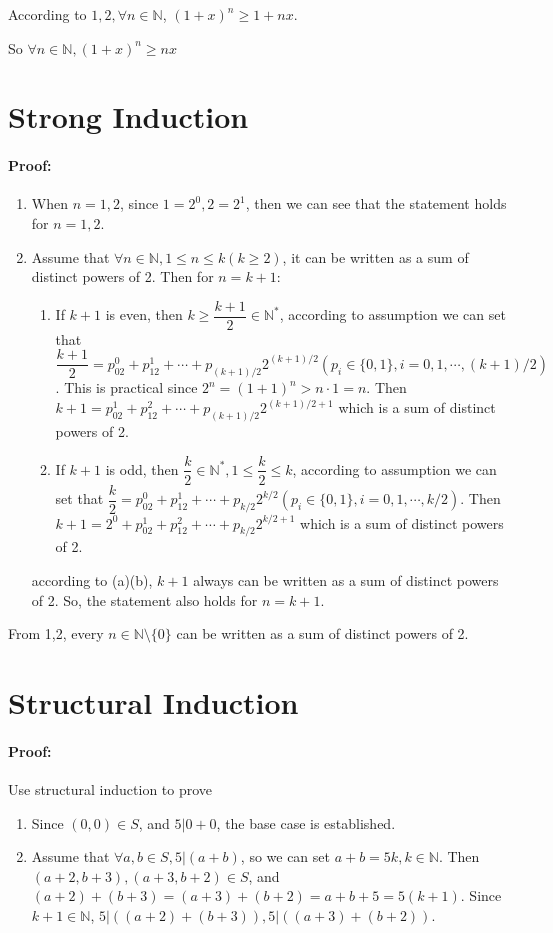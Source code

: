 \documentclass[a4paper,12pt,titlepage]{article}
\begin{document}
According to $1,2, \forall n \in\mathbb{N}$, $(1+x)^n\geqslant1+nx$.

So $ \forall n \in \mathbb{N}, (1+x)^n \geqslant nx$

\section{Strong Induction}
\paragraph{Proof:}
\begin{enumerate}
\item When $n=1,2$, since $1=2^0,2=2^1$, then we can see that the statement holds for $n=1,2$.
\item Assume that $\forall n\in\mathbb{N},1\leqslant n\leqslant k(k\geqslant2)$, it can be written as a sum of distinct powers of 2. Then for $n=k+1$:
\begin{enumerate}
\item If $k+1$ is even, then $k\geqslant\dfrac{k+1}{2}\in\mathbb{N}^*$, according to assumption we can set that $\dfrac{k+1}{2}=p_02^{0}+p_12^1+\cdots+p_{(k+1)/2}2^{(k+1)/2}(p_i\in\lbrace0,1\rbrace,i=0,1,\cdots,(k+1)/2)$. This is practical since $2^n=(1+1)^n>n\cdot1=n$. Then $k+1=p_02^{1}+p_12^2+\cdots+p_{(k+1)/2}2^{(k+1)/2+1}$ which is a sum of distinct powers of 2.

\item If $k+1$ is odd, then $\dfrac{k}{2}\in\mathbb{N}^*,1\leqslant\dfrac{k}{2}\leqslant k$, according to assumption we can set that $\dfrac{k}{2}=p_02^{0}+p_12^1+\cdots+p_{k/2}2^{k/2}(p_i\in\lbrace0,1\rbrace,i=0,1,\cdots,k/2)$. Then $k+1=2^0+p_02^{1}+p_12^2+\cdots+p_{k/2}2^{k/2+1}$ which is a sum of distinct powers of 2.
\end{enumerate}
according to (a)(b), $k+1$ always can be written as a sum of distinct powers of 2. So, the statement also holds for $n=k+1$.
\end{enumerate}

From 1,2, every $n\in\mathbb{N}\setminus\lbrace0\rbrace$ can be written as a sum of distinct powers of 2.

\section{Structural Induction}
\paragraph{Proof:}Use structural induction to prove
\begin{enumerate}
\item Since $(0,0)\in S$, and $5\big|0+0$, the base case is established.

\item Assume that $\forall a,b\in S, 5\big|(a+b)$, so we can set $a+b=5k,k\in\mathbb{N}$. Then $(a+2,b+3),(a+3,b+2)\in S$, and $(a+2)+(b+3)=(a+3)+(b+2)=a+b+5=5(k+1)$. Since $k+1\in \mathbb{N}$, $5\big| ((a+2)+(b+3)),5\big|((a+3)+(b+2))$.


\end{enumerate}
\end{document}
